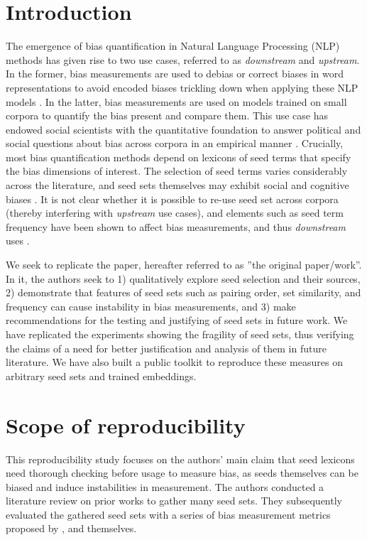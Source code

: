 \clearpage

\section{Introduction}
The emergence of bias quantification in Natural Language Processing (NLP) methods has given rise to two use cases, referred to as \emph{downstream} and \emph{upstream}. In the former, bias measurements are used to debias or correct biases in word representations to avoid encoded biases trickling down when applying these NLP models \citep{bolukbasi_man_2016, caliskan_semantics_2017}. In the latter, bias measurements are used on models trained on small corpora to quantify the bias present and compare them.
This use case has endowed social scientists with the quantitative foundation to answer political and
social questions about bias across corpora in an empirical manner
\citep{rudinger_social_2017,joseph_girls_2017}.
Crucially, most bias quantification methods depend on lexicons of seed terms that specify the bias dimensions of interest. The selection of seed terms varies considerably across the literature, and seed sets themselves may exhibit social and cognitive biases \citep{antoniak-mimno-2021-bad}. It is not clear whether it is possible to re-use seed set across corpora (thereby interfering with \emph{upstream} use cases), and elements such as seed term frequency have been shown to affect bias measurements, and thus \emph{downstream} uses \citep{ethayarajh2019understanding}.

We seek to replicate the \citet{antoniak-mimno-2021-bad} paper, hereafter referred to as ''the original paper/work''. In it, the authors seek to 1) qualitatively explore seed selection and their sources, 2) demonstrate that features of seed sets such as pairing order, set similarity, and frequency can cause instability in bias measurements, and 3) make recommendations for the testing and justifying of seed sets in future work. We have replicated the experiments showing the fragility of seed sets, thus verifying the claims of a need for better justification and analysis of them in future literature. We have also built a public toolkit to reproduce these measures on arbitrary seed sets and trained embeddings.

\section{Scope of reproducibility} \label{sec:claims}
This reproducibility study focuses on the authors' main claim that seed lexicons need thorough checking before usage to measure bias, as seeds themselves can be biased and induce instabilities in measurement. The authors conducted a literature review on prior works to gather many seed sets. They subsequently evaluated the gathered seed sets with a series of bias measurement metrics proposed by \citet{bolukbasi_man_2016, caliskan_semantics_2017}, and themselves.

